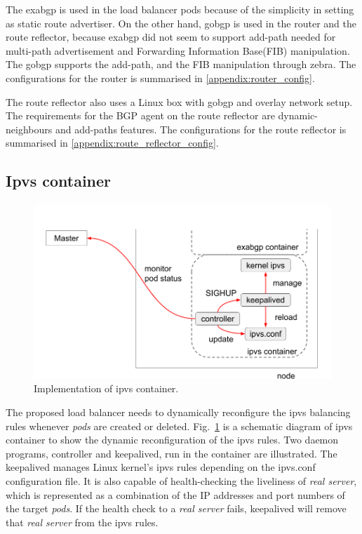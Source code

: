 The exabgp is used in the load balancer pods because of the simplicity in setting as static route advertiser.
On the other hand, gobgp is used in the router and the route reflector, because exabgp did not seem to support add-path\cite{rfc7911} needed for multi-path advertisement and Forwarding Information Base(FIB) manipulation\cite{exa-networks_2018}.
The gobgp supports the add-path, and the FIB manipulation through zebra\cite{osrg_gobgp_zebra}.
The configurations for the router is summarised in \ref{appendix:router_config}.

The route reflector also uses a Linux box with gobgp and overlay network setup.
The requirements for the BGP agent on the route reflector are dynamic-neighbours and add-paths features.
The configurations for the route reflector is summarised in \ref{appendix:route_reflector_config}.

\subsection{Ipvs container}

\begin{figure}[tb]
\includegraphics[width=\columnwidth]{Figs/ipvs-ingress-schem}
\caption{Implementation of ipvs container.}
\label{fig:ipvs-ingress-schem}
\end{figure}

The proposed load balancer needs to dynamically reconfigure the ipvs balancing rules whenever {\em pods} are created or deleted. 
Fig.~\ref{fig:ipvs-ingress-schem} is a schematic diagram of ipvs container to show the dynamic reconfiguration of the ipvs rules.
Two daemon programs, controller and keepalived, run in the container are illustrated.
The keepalived manages Linux kernel's ipvs rules depending on the ipvs.conf configuration file.
It is also capable of health-checking the liveliness of {\em real server}, 
which is represented as a combination of the IP addresses and port numbers of the target {\em pods}. 
If the health check to a {\em real server} fails, keepalived will remove that {\em real server} from the ipvs rules.

